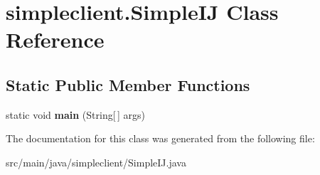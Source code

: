 \hypertarget{classsimpleclient_1_1SimpleIJ}{}\section{simpleclient.\+Simple\+IJ Class Reference}
\label{classsimpleclient_1_1SimpleIJ}
\subsection*{Static Public Member Functions}
\begin{DoxyCompactItemize}
\item 
\mbox{\label{classsimpleclient_1_1SimpleIJ_a60bead38827f9f752767613dfb06f7bf}} 
static void {\bfseries main} (String\mbox{[}$\,$\mbox{]} args)
\end{DoxyCompactItemize}


The documentation for this class was generated from the following file\+:\begin{DoxyCompactItemize}
\item 
src/main/java/simpleclient/Simple\+I\+J.\+java\end{DoxyCompactItemize}
